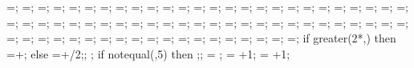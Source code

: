 {{\phorsprwid=\phorsprwid;
\phorsprlinethk=\phorsprlinethk;
\phorsuppwidth=\phorsuppwidth;
\phorsuppdepth=\phorsuppdepth;
\phorsupplinethk=\phorsupplinethk;
\pverspringspace=\pverspringspace;
\pvertextshiftx=\pvertextshiftx;
\pvertextshifty=\pvertextshifty;
\pverspringlength=\pverspringlength;
\pverampl=\pverampl;
\pversegm=\pversegm;
\pverspringthk=\pverspringthk;
\pversuppwidth=\pversuppwidth;
\pversuppdepth=\pversuppdepth;
\pversupplinethk=\pversupplinethk;
\showpaxialspring=\showpaxialspring;
\paxialspringlength=\paxialspringlength;
\paxialspringsegm=\paxialspringsegm;
\paxialspringwidth=\paxialspringwidth;
\paxialspringlinethk=\paxialspringlinethk;
\paxialsuppwidth=\paxialsuppwidth;
\paxialsuppdepth=\paxialsuppdepth;
\paxialsupplinethk=\paxialsupplinethk;
\leftwspringspace=\leftwspringspace;
\leftwtextshiftx=\leftwtextshiftx;
\leftwtextshifty=\leftwtextshifty;
\leftwspringlength=\leftwspringlength;
\leftwampl=\leftwampl;
\leftwsegm=\leftwsegm;
\leftwspringthk=\leftwspringthk;
\leftwsuppwidth=\leftwsuppwidth;
\leftwsuppdepth=\leftwsuppdepth;
\leftwsupplinethk=\leftwsupplinethk;
\rightwspringspace=\rightwspringspace;
\rightwtextshiftx=\rightwtextshiftx;
\rightwtextshifty=\rightwtextshifty;
\rightwspringlength=\rightwspringlength;
\rightwampl=\rightwampl;
\rightwsegm=\rightwsegm;
\rightwspringthk=\rightwspringthk;
\rightwsuppwidth=\rightwsuppwidth;
\rightwsuppdepth=\rightwsuppdepth;
\rightwsupplinethk=\rightwsupplinethk;
\foundspringspace=\foundspringspace;
\foundtextshiftx=\foundtextshiftx;
\foundtextshifty=\foundtextshifty;
\foundspringlength=\foundspringlength;
\foundampl=\foundampl;
\foundsegm=\foundsegm;
\foundspringthk=\foundspringthk;
\foundsuppwidth=\foundsuppwidth;
\foundsuppdepth=\foundsuppdepth;
\foundsupplinethk=\foundsupplinethk;
\lefttriw=\lefttriw;
\leftlinew=\leftlinew;
\leftlined=\leftlined;
\leftlinet=\leftlinet;
\leftxvalue=\leftxvalue;
\leftyvalue=\leftyvalue;
\righttriw=\righttriw;
\rightlinew=\rightlinew;
\rightlined=\rightlined;
\rightlinet=\rightlinet;
\rightxvalue=\rightxvalue;
\rightyvalue=\rightyvalue;
\bottomtriw=\bottomtriw;
\bottomlinew=\bottomlinew;
\bottomlined=\bottomlined;
\bottomlinet=\bottomlinet;
\bottomxvalue=\bottomxvalue;
\bottomyvalue=\bottomyvalue;
if greater(2*\massrad,\collinet) then {
\latloadshift=\latloadshift+\massrad;} else {
\latloadshift=\latloadshift+\collinet/2;};
;
%
if notequal(\showsupports,5) then {;};
%
\storyminone = ;
\columnnumber = \baynumber+1; %
\levelnumber = \storynumber+1; %
}}
